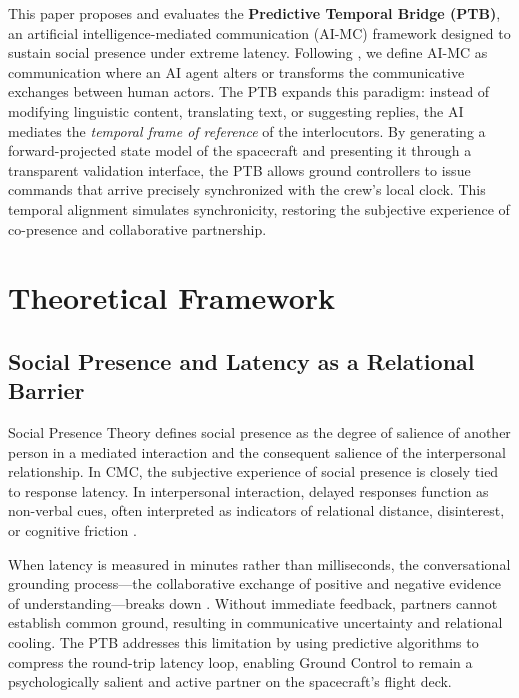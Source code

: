 \documentclass[12pt,a4paper]{article}
\begin{document}
This paper proposes and evaluates the \textbf{Predictive Temporal Bridge (PTB)}, an artificial intelligence-mediated communication (AI-MC) framework designed to sustain social presence under extreme latency. Following \citet{hancock2020}, we define AI-MC as communication where an AI agent alters or transforms the communicative exchanges between human actors. The PTB expands this paradigm: instead of modifying linguistic content, translating text, or suggesting replies, the AI mediates the \textit{temporal frame of reference} of the interlocutors. By generating a forward-projected state model of the spacecraft and presenting it through a transparent validation interface, the PTB allows ground controllers to issue commands that arrive precisely synchronized with the crew's local clock. This temporal alignment simulates synchronicity, restoring the subjective experience of co-presence and collaborative partnership.

\section{Theoretical Framework}

\subsection{Social Presence and Latency as a Relational Barrier}

Social Presence Theory \citep{short1976} defines social presence as the degree of salience of another person in a mediated interaction and the consequent salience of the interpersonal relationship. In CMC, the subjective experience of social presence is closely tied to response latency. In interpersonal interaction, delayed responses function as non-verbal cues, often interpreted as indicators of relational distance, disinterest, or cognitive friction \citep{walther1996}. 

When latency is measured in minutes rather than milliseconds, the conversational grounding process---the collaborative exchange of positive and negative evidence of understanding---breaks down \citep{walther1992}. Without immediate feedback, partners cannot establish common ground, resulting in communicative uncertainty and relational cooling. The PTB addresses this limitation by using predictive algorithms to compress the round-trip latency loop, enabling Ground Control to remain a psychologically salient and active partner on the spacecraft's flight deck.
\end{document}
